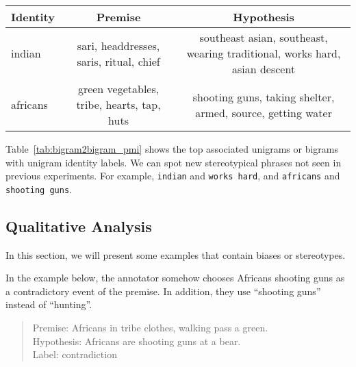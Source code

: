 \documentclass[11pt]{article}
\begin{document}
    \begin{table*}
        \small
        \centering
        \begin{tabular}{l|c|c}
            \hline
            Identity & Premise & Hypothesis \\
            \hline

            indian &
            sari,
            headdresses,
            saris,
            ritual,
            chief
            &
            southeast asian,
            southeast,
            wearing traditional,
            works hard,
            asian descent
            \\\hline

            africans &
            green vegetables,
            tribe,
            hearts,
            tap,
            huts
            &
            shooting guns,
            taking shelter,
            armed,
            source,
            getting water
            \\\hline

        \end{tabular}
        \caption{Top associated unigrams or bigrams with unigram identity labels}
        \label{tab:bigram2bigram_pmi}
    \end{table*}

    Table~\ref{tab:bigram2bigram_pmi} shows the top associated unigrams or bigrams with unigram identity labels.
    We can spot new stereotypical phrases not seen in previous experiments.
    For example, \texttt{indian} and \texttt{works hard}, and \texttt{africans} and \texttt{shooting guns}.

    \subsection{Qualitative Analysis}

    In this section, we will present some examples that contain biases or stereotypes.

    In the example below, the annotator somehow chooses Africans shooting guns as a
    contradictory event of the premise.
    In addition, they use ``shooting guns'' instead of ``hunting''.
    \begin{quote}
        Premise: Africans in tribe clothes, walking pass a green. \\
        Hypothesis: Africans are shooting guns at a bear. \\
        Label: contradiction
    \end{quote}
\end{document}

